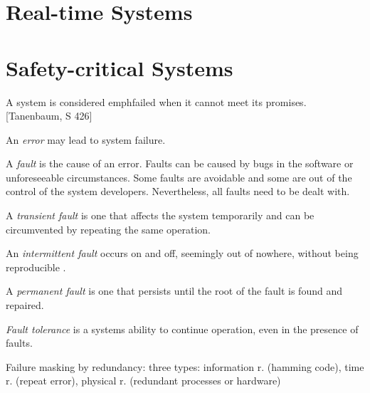 \section{Real-time Systems}

\section{Safety-critical Systems}
A system is considered emph{failed} when it cannot meet its promises. [Tanenbaum, S 426]

An \emph{error} may lead to system failure.

A \emph{fault} is the cause of an error. Faults can be caused by bugs in the software or unforeseeable circumstances. Some faults are avoidable and some are out of the control of the system developers. Nevertheless, all faults need to be dealt with.

A \emph{transient fault} is one that affects the system temporarily and can be circumvented by repeating the same operation.

An \emph{intermittent fault} occurs on and off, seemingly out of nowhere, without being reproducible .

A \emph{permanent fault} is one that persists until the root of the fault is found and repaired.

\emph{Fault tolerance} is a systems ability to continue operation, even in the presence of faults.

Failure masking by redundancy: three types: information r. (hamming code), time r. (repeat error), physical r. (redundant processes or hardware)





